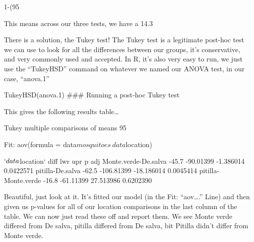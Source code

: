 \documentclass{article}
\begin{document}
1-(95%

This means across our three tests, we have a 14.3%

There is a solution, the Tukey test!
The Tukey test is a legitimate post-hoc test we can use to look for all the differences between our groups, it’s conservative, and very commonly used and accepted. In R, it’s also very easy to run, we just use the “TukeyHSD” command on whatever we named our ANOVA test, in our case, “anova.1”

TukeyHSD(anova.1)	\#\#\# Running a post-hoc Tukey test

This gives the following results table…

Tukey multiple comparisons of means
    95%

Fit: aov(formula = data$mosquitoes ~ data$location)

$`data$location`
                      diff        lwr        upr     p adj
Monte.verde-De.salva -45.7  -90.01399  -1.386014 0.0422571
pitilla-De.salva     -62.5 -106.81399 -18.186014 0.0045414
pitilla-Monte.verde  -16.8  -61.11399  27.513986 0.6202390

Beautiful, just look at it. It’s fitted our model (in the Fit: “aov….” Line) and then given us p-values for all of our location comparisons in the last column of the table. We can now just read these off and report them. We see Monte verde differed from De salva, pitilla differed from De salva, bit Pitilla didn’t differ from Monte verde. 
\end{document}

